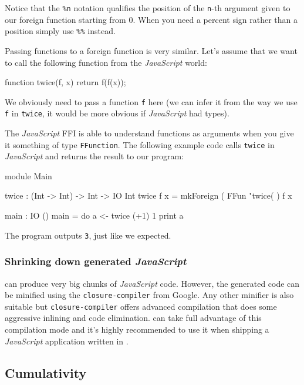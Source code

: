 \noindent
Notice that the \texttt{\%n} notation qualifies the position of the
\texttt{n}-th argument given to our foreign function starting from 0. When
you need a percent sign rather than a position simply use \texttt{\%\%}
instead.

\noindent
Passing functions to a foreign function is very similar. Let's assume that
we want to call the following function from the \emph{JavaScript} world:

\begin{code}[language=c]
function twice(f, x) {
  return f(f(x));
}
\end{code}

\noindent
We obviously need to pass a function \texttt{f} here (we can infer it from
the way we use \texttt{f} in \texttt{twice}, it would be more obvious if
\emph{JavaScript} had types).

\noindent
The \emph{JavaScript} FFI is able to understand functions as arguments when
you give it something of type \texttt{FFunction}. The following example code
calls \texttt{twice} in \emph{JavaScript} and returns the result to our
\Idris{} program:

\begin{code}
module Main

twice : (Int -> Int) -> Int -> IO Int
twice f x = mkForeign (
  FFun "twice(%
) f x

main : IO ()
main = do
  a <- twice (+1) 1
  print a
\end{code}

\noindent
The program outputs \texttt{3}, just like we expected.

\subsubsection*{Shrinking down generated \emph{JavaScript}}

\Idris{} can produce very big chunks of \emph{JavaScript} code. However, the
generated code can be minified using the \texttt{closure-compiler} from
Google. Any other minifier is also suitable but \texttt{closure-compiler}
offers advanced compilation that does some aggressive inlining and code
elimination. \Idris{} can take full advantage of this compilation mode and
it's highly recommended to use it when shipping a \emph{JavaScript}
application written in \Idris{}.

\subsection{Cumulativity}

